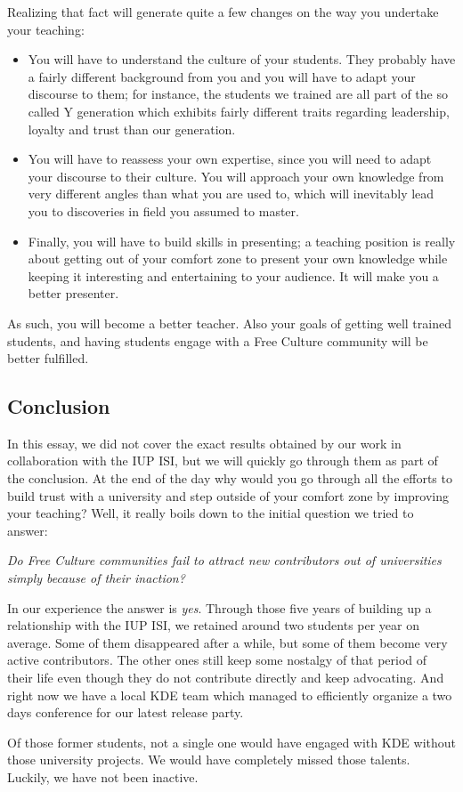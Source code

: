 Realizing that fact will generate quite a few changes on the way you undertake your teaching:
\begin{itemize}
  \item You will have to understand the culture of your students. They probably have a fairly different background from you and you will have to adapt your discourse to them; for instance, the students we trained are all part of the so called Y generation which exhibits fairly different traits regarding leadership, loyalty and trust than our generation.
  \item You will have to reassess your own expertise, since you will need to adapt your discourse to their culture. You will approach your own knowledge from very different angles than what you are used to, which will inevitably lead you to discoveries in field you assumed to master.
  \item Finally, you will have to build skills in presenting; a teaching position is really about getting out of your comfort zone to present your own knowledge while keeping it interesting and entertaining to your audience. It will make you a better presenter.
\end{itemize}

As such, you will become a better teacher. Also your goals of getting well trained students, and having students engage with a Free Culture community will be better fulfilled.

\subsection*{Conclusion}
In this essay, we did not cover the exact results obtained by our work in collaboration with the IUP ISI, but we will quickly go through them as part of the conclusion. At the end of the day why would you go through all the efforts to build trust with a university and step outside of your comfort zone by improving your teaching? Well, it really boils down to the initial question we tried to answer:

\emph{Do Free Culture communities fail to attract new contributors out of universities simply because of their inaction?}

In our experience the answer is \emph{yes}. Through those five years of building up a relationship with the IUP ISI, we retained around two students per year on average. Some of them disappeared after a while, but some of them become very active contributors. The other ones still keep some nostalgy of that period of their life even though they do not contribute directly and keep advocating. And right now we have a local KDE team which managed to efficiently organize a two days conference for our latest release party.

Of those former students, not a single one would have engaged with KDE without those university projects. We would have completely missed those talents. Luckily, we have not been inactive.
